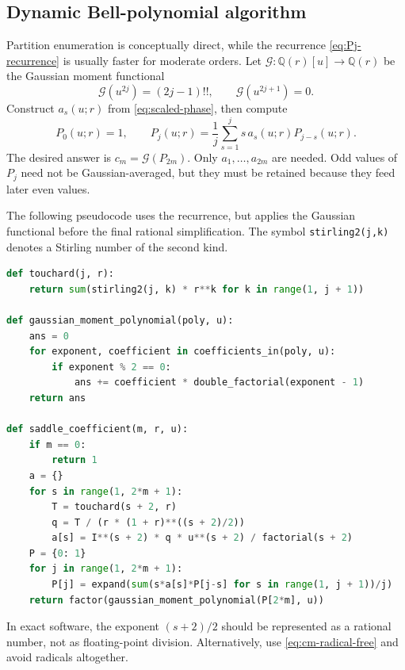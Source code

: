 \documentclass[11pt,a4paper]{article}
\theoremstyle{definition}
\theoremstyle{remark}
\newcommand{\Q}{\mathbb Q}
\newcommand{\Gauss}{\mathcal G}
\begin{document}
\subsection{Dynamic Bell-polynomial algorithm}

Partition enumeration is conceptually direct, while the recurrence
\cref{eq:Pj-recurrence} is usually faster for moderate orders.  Let
\(\Gauss:\Q(r)[u]\to\Q(r)\) be the Gaussian moment functional
\begin{equation}\label{eq:gaussian-functional}
 \Gauss(u^{2j})=(2j-1)!!,
 \qquad
 \Gauss(u^{2j+1})=0.
\end{equation}
Construct \(a_s(u;r)\) from \cref{eq:scaled-phase}, then compute
\begin{equation}\label{eq:algorithm-P-recurrence}
 P_0(u;r)=1,
 \qquad
 P_j(u;r)=\frac1j\sum_{s=1}^{j}s\,a_s(u;r)P_{j-s}(u;r).
\end{equation}
The desired answer is \(c_m=\Gauss(P_{2m})\).  Only \(a_1,\ldots,a_{2m}\)
are needed.  Odd values of \(P_j\) need not be Gaussian-averaged, but they
must be retained because they feed later even values.

\begin{algbox}[title={Exact symbolic pseudocode}]
The following pseudocode uses the recurrence, but applies the Gaussian
functional before the final rational simplification.  The symbol
\texttt{stirling2(j,k)} denotes a Stirling number of the second kind.
\begin{lstlisting}[language=Python,basicstyle=\ttfamily\small,columns=fullflexible,
breaklines=true,showstringspaces=false]
def touchard(j, r):
    return sum(stirling2(j, k) * r**k for k in range(1, j + 1))

def gaussian_moment_polynomial(poly, u):
    ans = 0
    for exponent, coefficient in coefficients_in(poly, u):
        if exponent % 2 == 0:
            ans += coefficient * double_factorial(exponent - 1)
    return ans

def saddle_coefficient(m, r, u):
    if m == 0:
        return 1
    a = {}
    for s in range(1, 2*m + 1):
        T = touchard(s + 2, r)
        q = T / (r * (1 + r)**((s + 2)/2))
        a[s] = I**(s + 2) * q * u**(s + 2) / factorial(s + 2)
    P = {0: 1}
    for j in range(1, 2*m + 1):
        P[j] = expand(sum(s*a[s]*P[j-s] for s in range(1, j + 1))/j)
    return factor(gaussian_moment_polynomial(P[2*m], u))
\end{lstlisting}
In exact software, the exponent \((s+2)/2\) should be represented as a rational
number, not as floating-point division.  Alternatively, use
\cref{eq:cm-radical-free} and avoid radicals altogether.
\end{algbox}
\end{document}
